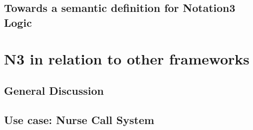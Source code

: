 \documentclass[11pt,a4paper,twoside]{book}
\newcommand\blankpage{%
    \null
    \thispagestyle{empty}%
    \addtocounter{page}{-1}%
    \newpage}
\theoremstyle{remark}
\begin{document}
    
    

    \printglossary[title=List of Abbreviations and Glossary] %

	


\mainmatter

\label{intro}





\chapter{Towards a semantic definition for Notation3 Logic}\label{problem}\label{semantics}



\label{ela}



\label{exsem}



\part{N3 in relation to other frameworks}\label{others}
\chapter{General Discussion}\label{gen}
\chapter{Use case: Nurse Call System}\label{orca}
\end{document}
